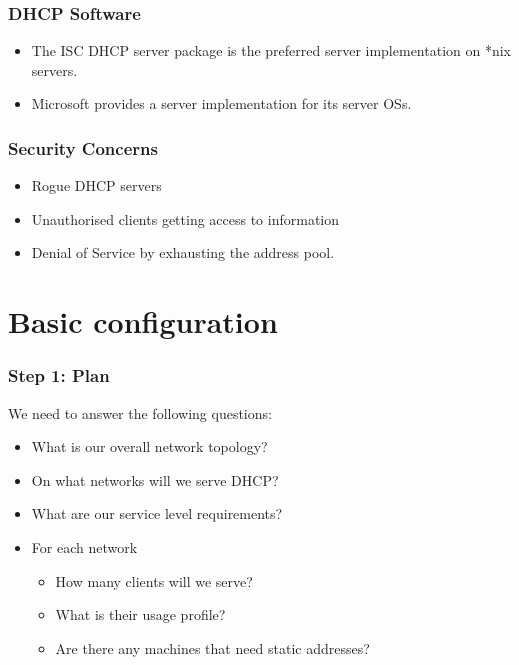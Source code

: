 \documentclass[10pt]{beamer}
\begin{document}
\begin{frame}
  \frametitle{DHCP Software}
  \begin{itemize}
    \item The ISC DHCP server package is the preferred server implementation 
          on *nix servers.
    \item Microsoft provides a server implementation for its server OSs.
  \end{itemize}  
\end{frame}

\begin{frame}
  \frametitle{Security Concerns}
  \begin{itemize}
    \item Rogue DHCP servers
    \item Unauthorised clients getting access to information
    \item Denial of Service by exhausting the address pool.
  \end{itemize}  
\end{frame}

\section{Basic configuration}
\begin{frame}
	\frametitle{Step 1: Plan}
	
	We need to answer the following questions:
	\begin{itemize}
		\item What is our overall network topology?
		\item On what networks will we serve DHCP?
		\item What are our service level requirements?
		\item For each network
		\begin{itemize}
			\item How many clients will we serve?
			\item What is their usage profile?
			\item Are there any machines that need static addresses?
		\end{itemize}
	\end{itemize}  
\end{frame}
\end{document}
